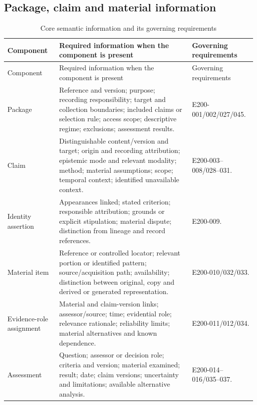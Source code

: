 \documentclass[11pt,a4paper]{article}
\begin{document}
\subsection{Package, claim and material information}
\begin{longtable}{L{0.18\textwidth}L{0.48\textwidth}L{0.22\textwidth}}
\caption{Core semantic information and its governing requirements}\label{tab:gr200-components}\\
\toprule
Component & Required information when the component is present & Governing requirements\\
\midrule\endfirsthead
\toprule
Component & Required information when the component is present & Governing requirements\\
\midrule\endhead
Package & Reference and version; purpose; recording responsibility; target and collection boundaries; included claims or selection rule; access scope; descriptive regime; exclusions; assessment results. & E200-001/002/027/045.\\
Claim & Distinguishable content/version and target; origin and recording attribution; epistemic mode and relevant modality; method; material assumptions; scope; temporal context; identified unavailable context. & E200-003--008/028--031.\\
Identity assertion & Appearances linked; stated criterion; responsible attribution; grounds or explicit stipulation; material dispute; distinction from lineage and record references. & E200-009.\\
Material item & Reference or controlled locator; relevant portion or identified pattern; source/acquisition path; availability; distinction between original, copy and derived or generated representation. & E200-010/032/033.\\
Evidence-role assignment & Material and claim-version links; assessor/source; time; evidential role; relevance rationale; reliability limits; material alternatives and known dependence. & E200-011/012/034.\\
Assessment & Question; assessor or decision role; criteria and version; material examined; result; date; claim versions; uncertainty and limitations; available alternative analysis. & E200-014--016/035--037.\\
\bottomrule
\end{longtable}
\end{document}

